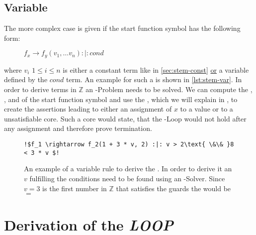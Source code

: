 \subsection{Variable \stem}
\label{sec:stem-var}
The more complex case is given if the start function symbol has the following form:
\begin{figure}[H]
	\hspace{2cm}
	$f_x \rightarrow f_y(v_1, \dots v_n) :|: cond$
\end{figure}
where $v_i$ $1 \le i \le n$ is either a constant term like in \autoref{sec:stem-const} \underline{or} a variable defined by the $cond$ term. An example for such a \stem is shown in \autoref{lst:stem-var}. In order to derive terms in $\mathbb{Z}$ an -Problem needs to be solved. We can compute the \guardmatrix, \guardconstants, \updatematrix and \updateconstants of the start function symbol and use the \smtfactory, which we will explain in %
, to create the assertions leading to either an assignment of $x$ to a value or to a unsatisfiable core. Such a core would state, that the -Loop would not hold after any assignment and therefore prove termination.

\newsavebox{\stemextwo}%
\newsavebox{\stemextwosecond}%
\begin{figure}[H]
	\begin{lstlisting}[escapechar=!]
	!$f_1 \rightarrow f_2(1 + 3 * v, 2) :|: v > 2\text{ \&\& }8 < 3 * v $!
	\end{lstlisting}	
	\caption{An example of a variable \its rule to derive the \stem. In order to derive it an $v$ fulfilling the conditions need to be found using an -Solver. Since $v=3$ is the first number in $\mathbb{Z}$ that satisfies the guards the \stem would be \usebox{\stemextwo}$=$\usebox{\stemextwosecond} }
	\label{lst:stem-var}
\end{figure}

\section{Derivation of the \emph{LOOP}}

